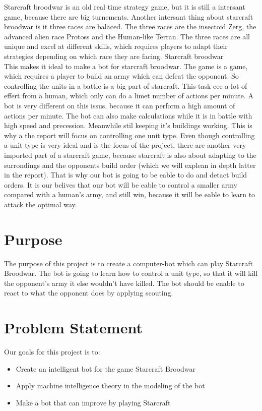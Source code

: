 Starcraft broodwar is an old real time strategy game, but it is still a intersant game, because there are big turnements. Another intersant thing about starcraft
broodwar is it three races are balaced. The three races are the insectoid Zerg, the advanced alien race Protoss and the Human-like Terran. The three races are all unique
and excel at different skills, which requires players to adapt their strategies depending on which race they are facing. Starcraft broodwar \\

This makes it ideal to make a bot for starcraft broodwar. The game is a \abrts game, which requires a player to build an army which can defeat the opponent.
So controlling the units in a battle is a big part of starcraft. This task eee a lot of effert from a human, which only can do a limet number of actions per minute. A bot
is very different on this issus, because it can perform a high amount of actions per minute. The bot can also make calculations while it is in battle with high speed and precession.
Meanwhile stil keeping it's buildings working. This is why a the report will focus on controlling one unit type. Even though controlling a unit type is very ideal and is the focus of
the project, there are another very imported part of a starcraft game, because starcraft is also about adapting to the surrondings and the opponents build order (which we will
explean in depth latter in the report). That is why our bot is going to be eable to do and detact build orders. It is our belives that our bot will be eable to control a  smaller army
compared with a human's army, and still win, because it will be eable to learn to attack the optimal way.


\section{Purpose}
	The purpose of this project is to create a computer-bot which can play Starcraft Broodwar. 
	The bot is going to learn how to control a unit type, so that it will kill the opponent's army it else wouldn't have killed.
	The bot should be enable to react to what the opponent does by applying scouting.

\section{Problem Statement}
	Our goals for this project is to:
	\begin{itemize}
		\item Create an intelligent bot for the game Starcraft Broodwar
		\item Apply machine intelligence theory in the modeling of the bot
		\item Make a bot that can improve by playing Starcraft
	\end{itemize}

